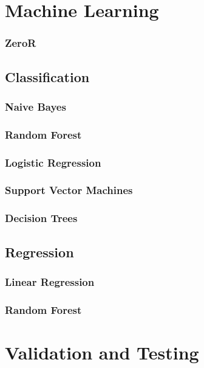 \section{Machine Learning}


\subsubsection{ZeroR}


\subsection{Classification}


\subsubsection{Naive Bayes}


\subsubsection{Random Forest}


\subsubsection{Logistic Regression}


\subsubsection{Support Vector Machines}


\subsubsection{Decision Trees}


\subsection{Regression}


\subsubsection{Linear Regression}


\subsubsection{Random Forest}


\section{Validation and Testing}


